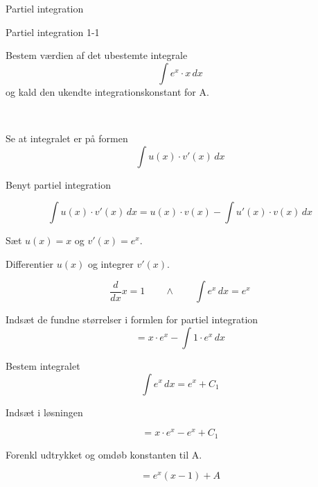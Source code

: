 \documentclass{article}
\begin{document}
Partiel integration
\tableofcontents



\begin{exercise}{Partiel integration 1-1}
	
	
	Bestem værdien af det ubestemte integrale
	\[
	\int e^x \cdot x \, dx
	\]
	og kald den ukendte integrationskonstant for A.
	
	 \\
	
	
	\hint
	
	Se at integralet er på formen
	\[
	\int u(x) \cdot v'(x) \, dx
	\]
	
	\hint
	
	Benyt partiel integration
	
	\hint
	\[
	\int u(x) \cdot v'(x)\, dx = u(x) \cdot v(x) - \int u'(x) \cdot v(x) \, dx
	\]
	\hint
	
	Sæt $u(x) = x$ og $v'(x) = e^x$.
	
	
	\hint
	
	Differentier $u(x)$ og integrer $v'(x)$.
	
	\hint
	\[
	\frac{d}{dx}x = 1 \qquad \wedge \qquad \int e^x \, dx = e^x
	\]
	
	\hint
	
	Indsæt de fundne størrelser i formlen for partiel integration
	\[
	= x \cdot e^x - \int 1 \cdot e^x \, dx
	\]
	
	\hint
	
	Bestem integralet
	\[
	\int e^x \, dx = e^x + C_1
	\]
	
	\hint
	Indsæt i løsningen 
	
	\hint
	
	\[
	= x \cdot e^x - e^x + C_1
	\]
	
	\hint
	
	Forenkl udtrykket og omdøb konstanten til A.
	
	\hint
	
	\[
	= e^x(x - 1)  + A
	\]
	
	
\end{exercise}

\newpage
\end{document}
